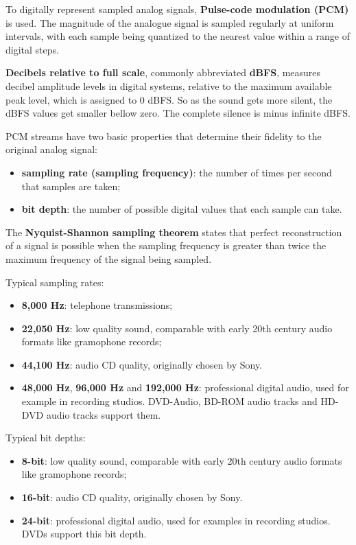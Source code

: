 To digitally represent sampled analog signals, \textbf{Pulse-code modulation
(PCM)} is used. The magnitude of the analogue signal is sampled regularly at
uniform intervals, with each sample being quantized to the nearest value
within a range of digital steps.

\textbf{Decibels relative to full scale}, commonly abbreviated \textbf{dBFS},
measures decibel amplitude levels in digital systems, relative to the maximum
available peak level, which is assigned to 0 dBFS. So as the sound gets more
silent, the dBFS values get smaller bellow zero. The complete silence is minus
infinite dBFS.

PCM streams have two basic properties that determine their fidelity to the
original analog signal:
\begin{itemize}
  \item \textbf{sampling rate (sampling frequency)}: the number of times per
  second that samples are taken;
  \item \textbf{bit depth}: the number of possible digital values that each
  sample can take.
\end{itemize}

The \textbf{Nyquist-Shannon sampling theorem} states that perfect
reconstruction of a signal is possible when the sampling frequency is greater
than twice the maximum frequency of the signal being sampled.

Typical sampling rates:
\begin{itemize}
  \item \textbf{8,000 Hz}: telephone transmissions;
  \item \textbf{22,050 Hz}: low quality sound, comparable with early 20th
  century audio formats like gramophone records;
  \item \textbf{44,100 Hz}: audio CD quality, originally chosen by Sony.
  \item \textbf{48,000 Hz}, \textbf{96,000 Hz} and \textbf{192,000 Hz}:
  professional digital audio, used for example in recording studios.
  DVD-Audio, BD-ROM audio tracks and HD-DVD audio tracks support them.
\end{itemize}

Typical bit depths:
\begin{itemize}
  \item \textbf{8-bit}: low quality sound, comparable with early 20th century
  audio formats like gramophone records;
  \item \textbf{16-bit}: audio CD quality, originally chosen by Sony.
  \item \textbf{24-bit}: professional digital audio, used for examples in
  recording studios. DVDs support this bit depth.
\end{itemize}

